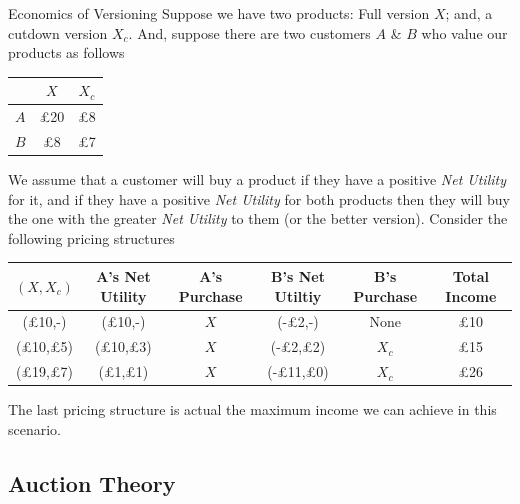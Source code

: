 \documentclass[11pt,a4paper]{article}
\begin{document}
  \begin{example}{Economics of Versioning}
    Suppose we have two products: Full version $X$; and, a cutdown version $X_c$. And, suppose there are two customers $A$ \& $B$ who value our products as follows
    \begin{center}
      \begin{tabular}{|c|c|c|}
        \hline
        &$X$&$X_c$\\
        \hline
        $A$&£20&£8\\
        $B$&£8&£7\\\hline
      \end{tabular}
    \end{center}
    We assume that a customer will buy a product if they have a positive \textit{Net Utility} for it, and if they have a positive \textit{Net Utility} for both products then they will buy the one with the greater \textit{Net Utility} to them (or the better version). Consider the following pricing structures
    \begin{center}
      \begin{tabular}{|c|c|c|c|c|c|}
        \hline
        $(X,X_c)$&A's Net Utility&A's Purchase&B's Net Utiltiy&B's Purchase&Total Income\\
        \hline
        (£10,-)&(£10,-)&$X$&(-£2,-)&None&£10\\
        (£10,£5)&(£10,£3)&$X$&(-£2,£2)&$X_c$&£15\\
        (£19,£7)&(£1,£1)&$X$&(-£11,£0)&$X_c$&£26\\\hline
      \end{tabular}
    \end{center}
    The last pricing structure is actual the maximum income we can achieve in this scenario.
  \end{example}

\subsection{Auction Theory} \label{sec_AuctionTheory}
\end{document}
